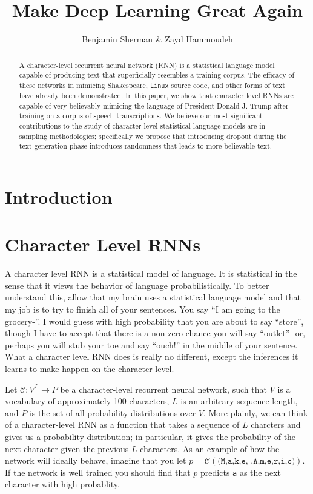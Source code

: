 \documentclass{article}
\begin{document}
\author{Benjamin Sherman \& Zayd Hammoudeh}
\title{Make Deep Learning Great Again}

\maketitle

\begin{abstract}
A character-level recurrent neural network (RNN) is a statistical language model capable of producing text that superficially resembles a training corpus. The efficacy of these networks in mimicing Shakespeare, \texttt{Linux} source code, and other forms of text have already been demonstrated. In this paper, we show that character level RNNs are capable of very believably mimicing the language of President Donald J. Trump after training on a corpus of speech transcriptions. We believe our most significant contributions to the study of character level statistical language models are in sampling methodologies; specifically we propose that introducing dropout during the text-generation phase introduces randomness that leads to more believable text.
\end{abstract}

\section{Introduction}


\section{Character Level RNNs}

A character level RNN is a statistical model of language. It is statistical in the sense that it views the behavior of language probabilistically. To better understand this, allow that my brain uses a statistical language model and that my job is to try to finish all of your sentences. You say ``I am going to the grocery-''. I would guess with high probability that you are about to say ``store'', though I have to accept that there is a non-zero chance you will say ``outlet''- or, perhaps you will stub your toe and say ``ouch!'' in the middle of your sentence. What a character level RNN does is really no different, except the inferences it learns to make happen on the character level.

Let $\mathcal{C} : V^L \rightarrow P$ be a character-level recurrent neural network, such that $V$ is a vocabulary of approximately 100 characters, $L$ is an arbitrary sequence length, and $P$ is the set of all probability distributions over $V$. More plainly, we can think of a character-level RNN as a function that takes a sequence of $L$ charcters and gives us a probability distribution; in particular, it gives the probability of the next character given the previous $L$ characters. As an example of how the network will ideally behave, imagine that you let $p = \mathcal{C}(\texttt{(M,a,k,e, ,A,m,e,r,i,c)})$. If the network is well trained you should find that $p$ predicts \texttt{a} as the next character with high probablity.
\end{document}

